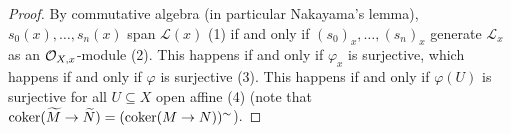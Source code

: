 \begin{proof}
  By commutative algebra (in particular
  Nakayama's lemma),
  $s_0(x), \dots, s_n(x)$ span
  $\mathcal{L}(x)$ (1) if and only if
  $(s_0)_x, \dots, (s_n)_x$ generate $\mathcal{L}_x$ as an $\mathcal{O}_{X, x}$-module (2).
  This happens if and only if
  $\varphi_x$ is surjective, which happens
  if and only if $\varphi$ is surjective (3).
  This happens if and only if
  $\varphi(U)$ is surjective for all
  $U \subseteq X$ open affine (4)
  (note that $\operatorname{coker}(\widetilde{M} \to \widetilde{N}) = (\operatorname{coker}(M \to N))^{\sim}$).
\end{proof}
